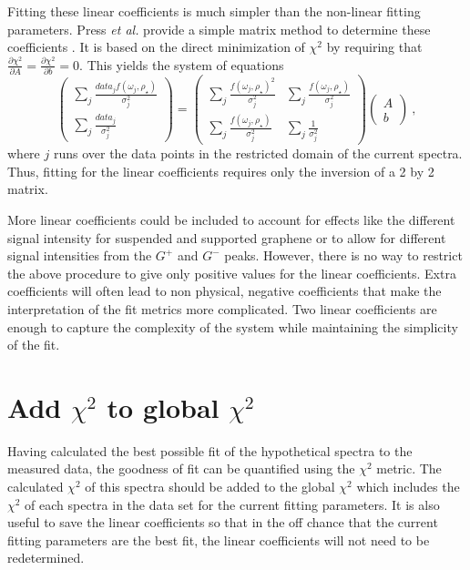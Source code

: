 Fitting these linear coefficients is much simpler than the non-linear fitting parameters.
Press \emph{et al.} provide a simple matrix method to determine these coefficients \cite{Press2007}.
It is based on the direct minimization of $\chi^2$ by requiring that $\frac{\partial \chi^2}{\partial A}=\frac{\partial \chi^2}{\partial b}=0$.
This yields the system of equations
\begin{equation*}
	\left( \begin{array}{c}
		\sum_j \frac{data_j f(\omega_j,\rho_{\star})}{\sigma_j^2} \\
		\sum_j \frac{data_j                          }{\sigma_j^2}
	\end{array} \right)
	=
	\left( \begin{array}{cc}
		\sum_j \frac{f(\omega_j,\rho_{\star})^2}{\sigma_j^2} & \sum_j \frac{f(\omega_j,\rho_{\star})}{\sigma_j^2} \\
		\sum_j \frac{f(\omega_j,\rho_{\star})}{\sigma_j^2} & \sum_j \frac{1}{\sigma_j^2}
	\end{array} \right)
	\left( \begin{array}{c}
		A \\
		b
	\end{array} \right) \ ,
\end{equation*} 
where $j$ runs over the data points in the restricted domain of the current spectra.
Thus, fitting for the linear coefficients requires only the inversion of a 2 by 2 matrix.

More linear coefficients could be included to account for effects like the different signal intensity for suspended and supported graphene or to allow for different signal intensities from the $G^+$ and $G^-$ peaks.
However, there is no way to restrict the above procedure to give only positive values for the linear coefficients.
Extra coefficients will often lead to non physical, negative coefficients that make the interpretation of the fit metrics more complicated.
Two linear coefficients are enough to capture the complexity of the system while maintaining the simplicity of the fit.

\section*{Add $\chi^2$ to global $\chi^2$}
Having calculated the best possible fit of the hypothetical spectra to the measured data, the goodness of fit can be quantified using the $\chi^2$ metric.
The calculated $\chi^2$ of this spectra should be added to the global $\chi^2$ which includes the $\chi^2$ of each spectra in the data set for the current fitting parameters.
It is also useful to save the linear coefficients so that in the off chance that the current fitting parameters are the best fit, the linear coefficients will not need to be redetermined.

